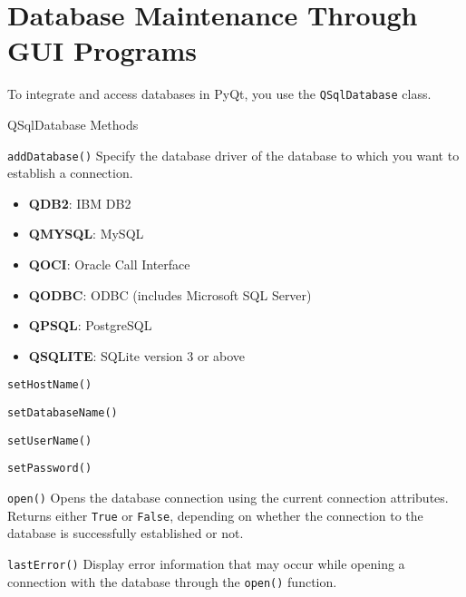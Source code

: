 \documentclass[notes.tex]{subfiles}
\begin{document}
		\section{Database Maintenance Through GUI Programs}
			To integrate and access databases in PyQt, you use the \verb|QSqlDatabase| class.
			\begin{sidenote}{QSqlDatabase Methods}
				\begin{descriptimize}[nosep]
					\item[\texttt{addDatabase()}] Specify the database driver of the database to which you want to establish a connection.
						\begin{itemize}[nosep]
							\item \textbf{QDB2}: IBM DB2
							\item \textbf{QMYSQL}: MySQL
							\item \textbf{QOCI}: Oracle Call Interface
							\item \textbf{QODBC}: ODBC (includes Microsoft SQL Server)
							\item \textbf{QPSQL}: PostgreSQL
							\item \textbf{QSQLITE}: SQLite version 3 or above
						\end{itemize}
					\item[\texttt{setHostName()}]
					\item[\texttt{setDatabaseName()}]
					\item[\texttt{setUserName()}]
					\item[\texttt{setPassword()}]
					\item[\texttt{open()}] Opens the database connection using the current connection attributes. Returns either \verb|True| or \verb|False|, depending on whether the connection to the database is successfully established or not.
					\item[\texttt{lastError()}] Display error information that may occur while opening a connection with the database through the \verb|open()| function.
				\end{descriptimize}
			\end{sidenote}

			\pagebreak
\end{document}
